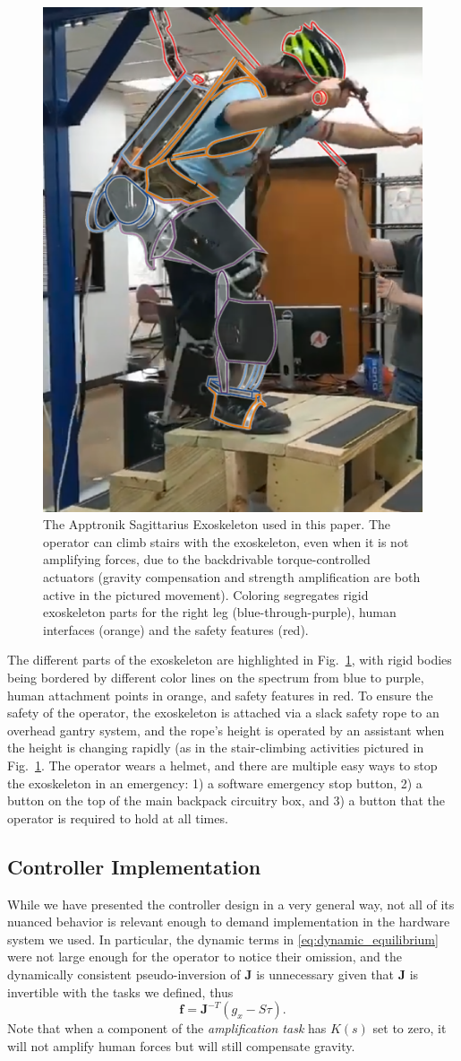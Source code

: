 \documentclass[utf8]{frontiersSCNS}
\begin{document}
\begin{figure}[]\centering
	\includegraphics[width=.5\columnwidth]{exo_parts.pdf}%
	\caption{The Apptronik Sagittarius Exoskeleton used in this paper. The operator can climb stairs with the exoskeleton, even when it is not amplifying forces, due to the backdrivable torque-controlled actuators (gravity compensation and strength amplification are both active in the pictured movement). Coloring segregates rigid exoskeleton parts for the right leg (blue-through-purple), human interfaces (orange) and the safety features (red).}\label{fig:parts}
\end{figure}

The different parts of the exoskeleton are highlighted in Fig.~\ref{fig:parts}, with rigid bodies being bordered by different color lines on the spectrum from blue to purple, human attachment points in orange, and safety features in red. To ensure the safety of the operator, the exoskeleton is attached via a slack safety rope to an overhead gantry system, and the rope's height is operated by an assistant when the height is changing rapidly (as in the stair-climbing activities pictured in Fig.~\ref{fig:parts}. The operator wears a helmet, and there are multiple easy ways to stop the exoskeleton in an emergency: 1) a software emergency stop button, 2) a button on the top of the main backpack circuitry box, and 3) a button that the operator is required to hold at all times. 


\subsection{Controller Implementation}
While we have presented the controller design in a very general way, not all of its nuanced behavior is relevant enough to demand implementation in the hardware system we used. In particular, the dynamic terms in \eqref{eq:dynamic_equilibrium} were not large enough for the operator to notice their omission, and the dynamically consistent pseudo-inversion of $\mathbf J$ is unnecessary given that $\mathbf J$ is invertible with the tasks we defined, thus
\begin{equation}
\mathbf f = \mathbf J^{-T} (g_x - S\tau).
\end{equation}
Note that when a component of the \emph{amplification task} has $K(s)$ set to zero, it will not amplify human forces but will still compensate gravity.
\end{document}
